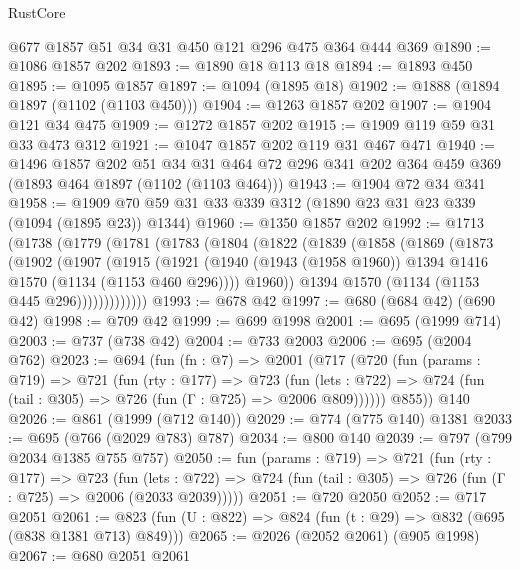 \begin{lexlean}{RustCore}
\begin{coremodule}
{\begin{coremodule}
{{{{{{{{{    @677
    @1857
    @51
    @34
    @31
    @450
    @121
    @296
    @475
    @364
    @444
    @369
@1890 := @1086 @1857 @202
@1893 := @1890 @18 @113 @18
@1894 := @1893 @450
@1895 := @1095 @1857
@1897 := @1094 (@1895 @18)
@1902 := @1888 (@1894 @1897 (@1102 (@1103 @450)))
@1904 := @1263 @1857 @202
@1907 := @1904 @121 @34 @475
@1909 := @1272 @1857 @202
@1915 := @1909 @119 @59 @31 @33 @473 @312
@1921 := @1047 @1857 @202 @119 @31 @467 @471
@1940 := @1496
    @1857
    @202
    @51
    @34
    @31
    @464
    @72
    @296
    @341
    @202
    @364
    @459
    @369
    (@1893 @464 @1897 (@1102 (@1103 @464)))
@1943 := @1904 @72 @34 @341
@1958 := @1909 @70 @59 @31 @33 @339 @312 (@1890 @23 @31 @23 @339 (@1094 (@1895 @23)) @1344)
@1960 := @1350 @1857 @202
@1992 := @1713
    (@1738
      (@1779
        (@1781
          (@1783
            (@1804
              (@1822
                (@1839
                  (@1858
                    (@1869
                      (@1873
                        (@1902
                          (@1907
                            (@1915
                              (@1921
                                (@1940
                                  (@1943 (@1958 @1960))
                                  @1394
                                  @1416
                                  @1570
                                  (@1134 (@1153 @460 @296))))
                              @1960))
                          @1394
                          @1570
                          (@1134 (@1153 @445 @296)))))))))))))
@1993 := @678 @42
@1997 := @680 (@684 @42) (@690 @42)
@1998 := @709 @42
@1999 := @699 @1998
@2001 := @695 (@1999 @714)
@2003 := @737 (@738 @42)
@2004 := @733 @2003
@2006 := @695 (@2004 @762)
@2023 := @694
    (fun (fn : @7) =>
    @2001
      (@717
        (@720
          (fun (params : @719) =>
          @721
            (fun (rty : @177) =>
            @723
              (fun (lets : @722) =>
              @724 (fun (tail : @305) => @726 (fun (Γ : @725) => @2006 @809))))))
        @855))
    @140
@2026 := @861 (@1999 (@712 @140))
@2029 := @774 (@775 @140) @1381
@2033 := @695 (@766 (@2029 @783) @787)
@2034 := @800 @140
@2039 := @797 (@799 @2034 @1385 @755 @757)
@2050 := fun (params : @719) =>
  @721
    (fun (rty : @177) =>
    @723
      (fun (lets : @722) =>
      @724 (fun (tail : @305) => @726 (fun (Γ : @725) => @2006 (@2033 @2039)))))
@2051 := @720 @2050
@2052 := @717 @2051
@2061 := @823 (fun (U : @822) => @824 (fun (t : @29) => @832 (@695 (@838 @1381 @713) @849)))
@2065 := @2026 (@2052 @2061) (@905 @1998)
@2067 := @680 @2051 @2061
}}}}}}}}}
\end{coremodule}}
\end{coremodule}
\end{lexlean}
